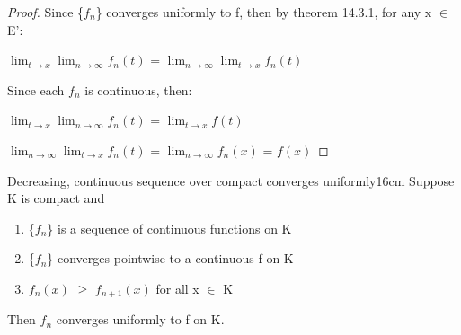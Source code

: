     \vspace{0.1cm}
    
    \begin{proof}
        Since \{$f_n$\} converges uniformly to f, then by {\color{red} theorem 14.3.1},
        for any x $\in$ E':

        \hspace{0.5cm}
        $\lim_{t \rightarrow x} \lim_{n \rightarrow \infty} f_n(t)$
        = $\lim_{n \rightarrow \infty} \lim_{t \rightarrow x} f_n(t)$

        Since each $f_n$ is continuous, then:

        \hspace{0.5cm}
        $\lim_{t \rightarrow x} \lim_{n \rightarrow \infty} f_n(t)$
        = $\lim_{t \rightarrow x} f(t)$

        \hspace{0.5cm}
        $\lim_{n \rightarrow \infty} \lim_{t \rightarrow x} f_n(t)$
        = $\lim_{n \rightarrow \infty} f_n(x)$ = $f(x)$
    \end{proof}

    \newpage



    \begin{wtheorem}{Decreasing, continuous sequence over compact
    converges uniformly}{16cm}
        Suppose K is compact and

        \begin{enumerate}[label=(\alph*), leftmargin=1.5cm, itemsep=0.1cm]
            \item \{$f_n$\} is a sequence of continuous functions on K
            
            \item \{$f_n$\} converges pointwise to a continuous f on K
            
            \item $f_n(x)$ $\geq$ $f_{n+1}(x)$ for all x $\in$ K
        \end{enumerate}

        Then $f_n$ converges uniformly to f on K.    
    \end{wtheorem}

